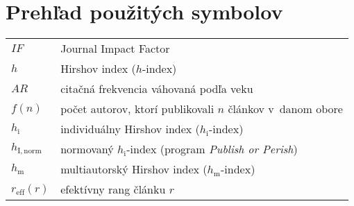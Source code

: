 \chapter*{Prehľad použitých symbolov}

\begin{flushleft}
  \begin{longtable}[l]{ll} %
    $IF$              & Journal Impact Factor \\[1mm]
    $h$               & Hirshov index ($h$-index) \\[1mm]
    $AR$              & citačná frekvencia váhovaná podľa veku \\[1mm]  
    $f(n)$            & počet autorov, ktorí publikovali $n$ článkov v~danom obore \\[1mm]
    $h_{\mathrm{i}}$       & individuálny Hirshov index ($h_{\mathrm{i}}$-index)  \\[1mm]
    $h_{\mathrm{I, norm}}$  & normovaný $h_{\mathrm{i}}$-index (program {\em Publish or Perish})\\[1mm]
    $h_{\mathrm{m}}$       & multiautorský Hirshov index ($h_{\mathrm{m}}$-index) \\[1mm]
    $r_{\mathrm{eff}}(r)$  & efektívny rang článku $r$\\[1mm]
  \end{longtable}
\end{flushleft}


